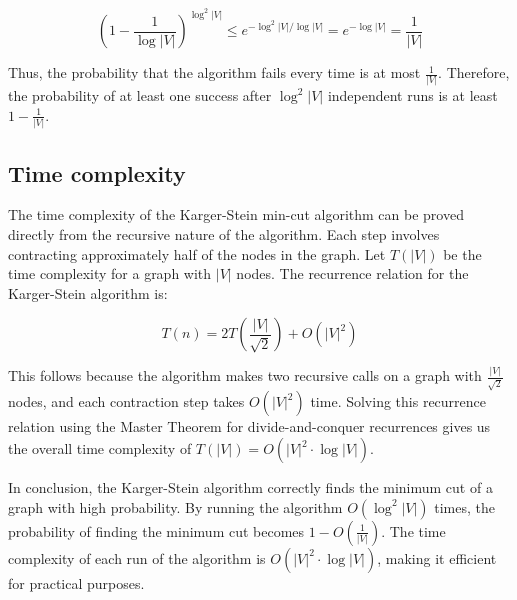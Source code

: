 \[
\left(1 - \frac{1}{\log |V|}\right)^{\log^2 |V|} \leq e^{-\log^2 |V| / \log |V|} = e^{-\log |V|} = \frac{1}{|V|}
\]

Thus, the probability that the algorithm fails every time is at most \( \frac{1}{|V|} \). Therefore, the probability of at least one success after \( \log^2 |V| \) independent runs is at least \( 1 - \frac{1}{|V|} \).

\subsection{Time complexity}

The time complexity of the Karger-Stein min-cut algorithm can be proved directly from the recursive nature of the algorithm. Each step involves contracting approximately half of the nodes in the graph. Let \( T(|V|) \) be the time complexity for a graph with \( |V| \) nodes. The recurrence relation for the Karger-Stein algorithm is:

\[
T(n) = 2T\left(\frac{|V|}{\sqrt{2}}\right) + O(|V|^2)
\]

This follows because the algorithm makes two recursive calls on a graph with \( \frac{|V|}{\sqrt{2}} \) nodes, and each contraction step takes \( O(|V|^2) \) time. Solving this recurrence relation using the Master Theorem for divide-and-conquer recurrences gives us the overall time complexity of \( T(|V|) = O(|V|^2 \cdot \log |V|) \).

In conclusion, the Karger-Stein algorithm correctly finds the minimum cut of a graph with high probability. By running the algorithm \( O(\log^2 |V|) \) times, the probability of finding the minimum cut becomes \( 1 - O\left(\frac{1}{|V|}\right) \). The time complexity of each run of the algorithm is \( O(|V|^2 \cdot \log |V|) \), making it efficient for practical purposes.
